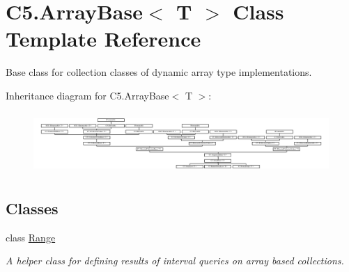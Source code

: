 \hypertarget{class_c5_1_1_array_base}{}\section{C5.\+Array\+Base$<$ T $>$ Class Template Reference}
\label{class_c5_1_1_array_base}


Base class for collection classes of dynamic array type implementations.  


Inheritance diagram for C5.\+Array\+Base$<$ T $>$\+:\begin{figure}[H]
\begin{center}
\leavevmode
\includegraphics[height=2.366197cm]{class_c5_1_1_array_base}
\end{center}
\end{figure}
\subsection*{Classes}
\begin{DoxyCompactItemize}
\item 
class \hyperlink{class_c5_1_1_array_base_1_1_range}{Range}
\begin{DoxyCompactList}\small\item\em A helper class for defining results of interval queries on array based collections. \end{DoxyCompactList}\end{DoxyCompactItemize}

